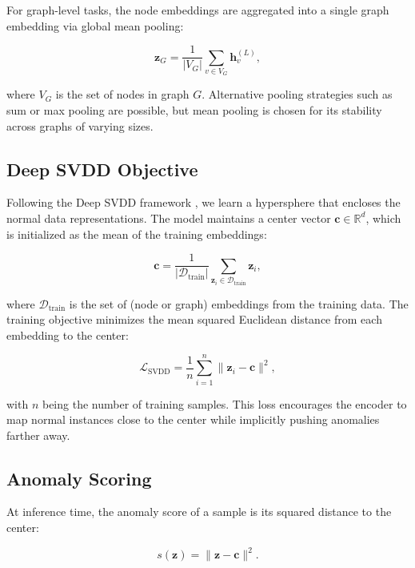 For graph-level tasks, the node embeddings are aggregated into a single graph embedding via global mean pooling:

\begin{equation}
\mathbf{z}_G = \frac{1}{|V_G|} \sum_{v \in V_G} \mathbf{h}_v^{(L)},
\label{eq:pooling}
\end{equation}

where $V_G$ is the set of nodes in graph $G$. Alternative pooling strategies such as sum or max pooling are possible, but mean pooling is chosen for its stability across graphs of varying sizes.

\subsection{Deep SVDD Objective}
\label{sec:svdd}

Following the Deep \ac{SVDD} framework \citep{ruff2018deepsvdd}, we learn a hypersphere that encloses the normal data representations. The model maintains a center vector $\mathbf{c} \in \mathbb{R}^d$, which is initialized as the mean of the training embeddings:

\begin{equation}
\mathbf{c} = \frac{1}{|\mathcal{D}_{\text{train}}|} \sum_{\mathbf{z}_i \in \mathcal{D}_{\text{train}}} \mathbf{z}_i,
\label{eq:center_init}
\end{equation}

where $\mathcal{D}_{\text{train}}$ is the set of (node or graph) embeddings from the training data. The training objective minimizes the mean squared Euclidean distance from each embedding to the center:

\begin{equation}
\mathcal{L}_{\text{SVDD}} = \frac{1}{n} \sum_{i=1}^{n} \|\mathbf{z}_i - \mathbf{c}\|^2,
\label{eq:svdd_loss}
\end{equation}

with $n$ being the number of training samples. This loss encourages the encoder to map normal instances close to the center while implicitly pushing anomalies farther away.

\subsection{Anomaly Scoring}
\label{sec:scoring}

At inference time, the anomaly score of a sample is its squared distance to the center:

\begin{equation}
s(\mathbf{z}) = \|\mathbf{z} - \mathbf{c}\|^2.
\label{eq:anomaly_score}
\end{equation}

